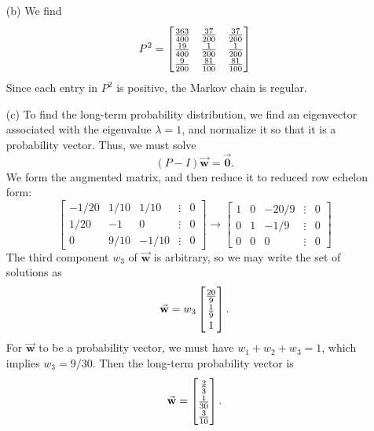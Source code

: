 \documentclass[reqno]{immbook}
\newcommand{\BW}{\vec{\textbf{w}}}
\newcommand{\BZero}{\vec{\textbf{0}}}  %
\newcommand{\T}{\rule{0pt}{2.6ex}}
\newcommand{\B}{\rule[-1.2ex]{0pt}{0pt}}
\numberwithin{equation}{chapter}
\numberwithin{question}{section}
\numberwithin{theorem}{chapter}
\numberwithin{figure}{chapter}
\theoremstyle{definition}
\begin{document}
\begin{enumerate}
\item[(b)]
We find
\[
  P ^2= \begin{bmatrix}
           \frac{363}{400} & \frac{37}{200} & \frac{37}{200} \T\B \\
	   \frac{19}{400} & \frac{1}{200}   & \frac{1}{200} \B  \\
	   \frac{9}{200}    & \frac{81}{100} & \frac{81}{100} \B
      \end{bmatrix}
\]
Since each entry in $P^2$ is positive, the Markov chain is regular.
\item[(c)]
To find the long-term probability distribution, we find an eigenvector
associated with the eigenvalue $\lambda=1$, and normalize it so that
it is a probability vector.
Thus, we must solve
\[
  (P-I)\BW = \BZero.
\]
We form the augmented matrix,
and then reduce it to reduced row echelon form:
\[
\begin{bmatrix}
   -1/20 & 1/10 & 1/10 & \vdots & 0 \\
   1/20  &   -1  &  0   & \vdots & 0 \\
   0     &  9/10 & -1/10 & \vdots & 0
\end{bmatrix}
\rightarrow
\begin{bmatrix}
   1  &   0  & -20/9  & \vdots & 0 \\
   0  &   1  & -1/9   & \vdots & 0 \\
   0  &   0  &  0     & \vdots & 0
\end{bmatrix}
\]
The third component $w_3$ of $\BW$ is arbitrary, so we may write
the set of solutions as
\[
   \BW = w_3 \begin{bmatrix}
               \frac{20}{9} \T\B \\ \frac{1}{9} \B\\ 1
             \end{bmatrix} .
\]
For $\BW$ to be a probability vector, we must have $w_1+w_2+w_3=1$,
which implies $w_3 = 9/30$.  Then the long-term probability vector
is
\[
  \BW = \begin{bmatrix}
          \frac{2}{3} \T\B \\ \frac{1}{30} \B \\ \frac{3}{10} \B
        \end{bmatrix} .
\]
\end{enumerate}
\end{document}
